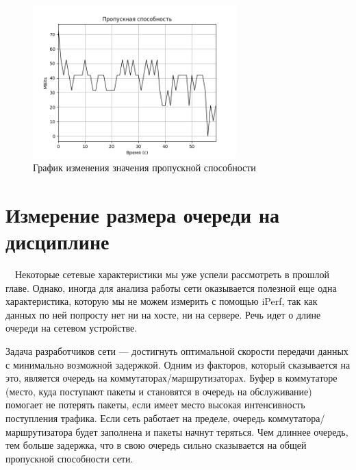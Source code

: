 \documentclass[
  13pt,
  fontsize=13pt,
  russian,
  a4paper,
,captions=tableheading
]{scrreprt}
\begin{document}
\begin{figure}
\hypertarget{fig:0035}{%
\centering
\includegraphics[width=0.7\textwidth,height=\textheight]{iproute_throughput.png}
\caption{График изменения значения пропускной
способности}\label{fig:0035}
}
\end{figure}

\hypertarget{ux438ux437ux43cux435ux440ux435ux43dux438ux435-ux440ux430ux437ux43cux435ux440ux430-ux43eux447ux435ux440ux435ux434ux438-ux43dux430-ux434ux438ux441ux446ux438ux43fux43bux438ux43dux435}{%
\section{Измерение размера очереди на
дисциплине}\label{ux438ux437ux43cux435ux440ux435ux43dux438ux435-ux440ux430ux437ux43cux435ux440ux430-ux43eux447ux435ux440ux435ux434ux438-ux43dux430-ux434ux438ux441ux446ux438ux43fux43bux438ux43dux435}}

\(\quad\)Некоторые сетевые характеристики мы уже успели рассмотреть в
прошлой главе. Однако, иногда для анализа работы сети оказывается
полезной еще одна характеристика, которую мы не можем измерить с помощью
iPerf, так как данных по ней попросту нет ни на хосте, ни на сервере.
Речь идет о длине очереди на сетевом устройстве.

Задача разработчиков сети --- достигнуть оптимальной скорости передачи
данных с минимально возможной задержкой. Одним из факторов, который
сказывается на это, является очередь на коммутаторах/маршрутизаторах.
Буфер в коммутаторе (место, куда поступают пакеты и становятся в очередь
на обслуживание) помогает не потерять пакеты, если имеет место высокая
интенсивность поступления трафика. Если сеть работает на пределе,
очередь коммутатора/маршрутизатора будет заполнена и пакеты начнут
теряться. Чем длиннее очередь, тем больше задержка, что в свою очередь
сильно сказывается на общей пропускной способности сети.
\end{document}
